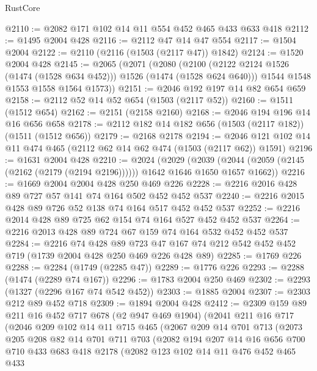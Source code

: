 \begin{lexlean}{RustCore}
\begin{coremodule}
@2110 := @2082 @171 @102 @14 @11 @554 @452 @465 @433 @633 @418
@2112 := @1495 @2004 @428
@2116 := @2112 @47 @14 @47 @554
@2117 := @1504 @2004
@2122 := @2110 (@2116 (@1503 (@2117 @47)) @1842)
@2124 := @1520 @2004 @428
@2145 := @2065
    (@2071
      (@2080
        (@2100 (@2122 @2124 @1526 (@1474 (@1528 @634 @452))) @1526 (@1474 (@1528 @624 @640)))
        @1544
        @1548
        @1553
        @1558
        @1564
        @1573))
@2151 := @2046 @192 @197 @14 @82 @654 @659
@2158 := @2112 @52 @14 @52 @654 (@1503 (@2117 @52))
@2160 := @1511 (@1512 @654)
@2162 := @2151 (@2158 @2160)
@2168 := @2046 @194 @196 @14 @16 @656 @658
@2178 := @2112 @182 @14 @182 @656 (@1503 (@2117 @182)) (@1511 (@1512 @656))
@2179 := @2168 @2178
@2194 := @2046 @121 @102 @14 @11 @474 @465 (@2112 @62 @14 @62 @474 (@1503 (@2117 @62)) @1591)
@2196 := @1631 @2004 @428
@2210 := @2024
    (@2029
      (@2039 (@2044 (@2059 (@2145 (@2162 (@2179 (@2194 @2196)))))) @1642 @1646 @1650 @1657 @1662))
@2216 := @1669 @2004 @2004 @428 @250 @469 @226
@2228 := @2216 @2016 @428 @89 @727 @57 @141 @74 @164 @502 @452 @452 @537
@2240 := @2216 @2015 @428 @89 @726 @52 @138 @74 @164 @517 @452 @452 @537
@2252 := @2216 @2014 @428 @89 @725 @62 @154 @74 @164 @527 @452 @452 @537
@2264 := @2216 @2013 @428 @89 @724 @67 @159 @74 @164 @532 @452 @452 @537
@2284 := @2216
    @74
    @428
    @89
    @723
    @47
    @167
    @74
    @212
    @542
    @452
    @452
    @719
    (@1739 @2004 @428 @250 @469 @226 @428 @89)
@2285 := @1769 @226
@2288 := @2284 (@1749 (@2285 @47))
@2289 := @1776 @226
@2293 := @2288 (@1474 (@2289 @74 @167))
@2296 := @1783 @2004 @250 @469
@2302 := @2293 (@1327 (@2296 @167 @74 @542 @452))
@2303 := @1885 @2004
@2307 := @2303 @212 @89 @452 @718
@2309 := @1894 @2004 @428
@2412 := @2309
    @159
    @89
    @211
    @16
    @452
    @717
    @678
    (@2 @947 @469 @1904)
    (@2041
      @211
      @16
      @717
      (@2046
        @209
        @102
        @14
        @11
        @715
        @465
        (@2067
          @209
          @14
          @701
          @713
          (@2073
            @205
            @208
            @82
            @14
            @701
            @711
            @703
            (@2082
              @194
              @207
              @14
              @16
              @656
              @700
              @710
              @433
              @683
              @418
              @2178
              (@2082
                @123
                @102
                @14
                @11
                @476
                @452
                @465
                @433

\end{coremodule}
\end{lexlean}
